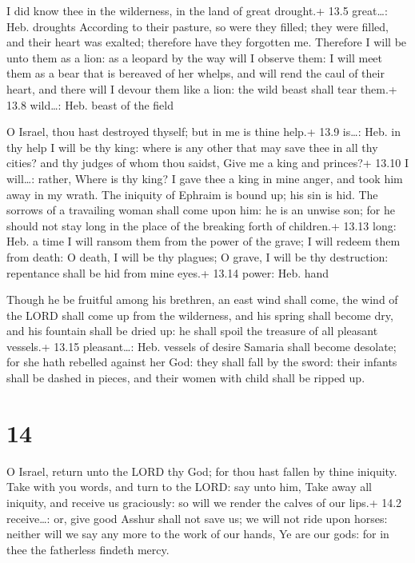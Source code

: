  I did know thee in the wilderness, in the land of great
drought.+ 13.5 great\ldots: Heb. droughts  According to
their pasture, so were they filled; they were filled, and their heart
was exalted; therefore have they forgotten me.  Therefore I
will be unto them as a lion: as a leopard by the way will I observe
them:  I will meet them as a bear that is bereaved of her
whelps, and will rend the caul of their heart, and there will I devour
them like a lion: the wild beast shall tear them.+ 13.8 wild\ldots: Heb.
beast of the field

 O Israel, thou hast destroyed thyself; but in me is thine
help.+ 13.9 is\ldots: Heb. in thy help  I will be thy king:
where is any other that may save thee in all thy cities? and thy judges
of whom thou saidst, Give me a king and princes?+ 13.10 I will\ldots:
rather, Where is thy king?  I gave thee a king in mine
anger, and took him away in my wrath.  The iniquity of
Ephraim is bound up; his sin is hid.  The sorrows of a
travailing woman shall come upon him: he is an unwise son; for he should
not stay long in the place of the breaking forth of children.+ 13.13
long: Heb. a time  I will ransom them from the power of the
grave; I will redeem them from death: O death, I will be thy plagues; O
grave, I will be thy destruction: repentance shall be hid from mine
eyes.+ 13.14 power: Heb. hand

 Though he be fruitful among his brethren, an east wind
shall come, the wind of the LORD shall come up from the wilderness, and
his spring shall become dry, and his fountain shall be dried up: he
shall spoil the treasure of all pleasant vessels.+ 13.15 pleasant\ldots:
Heb. vessels of desire  Samaria shall become desolate; for
she hath rebelled against her God: they shall fall by the sword: their
infants shall be dashed in pieces, and their women with child shall be
ripped up.

\hypertarget{section-13}{%
\section{14}\label{section-13}}

 O Israel, return unto the LORD thy God; for thou hast
fallen by thine iniquity.  Take with you words, and turn to
the LORD: say unto him, Take away all iniquity, and receive us
graciously: so will we render the calves of our lips.+ 14.2
receive\ldots: or, give good  Asshur shall not save us; we
will not ride upon horses: neither will we say any more to the work of
our hands, Ye are our gods: for in thee the fatherless findeth mercy.

